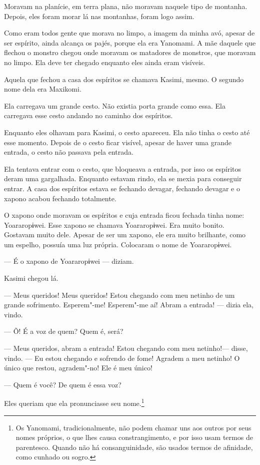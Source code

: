 Moravam na planície, em terra plana, não moravam naquele tipo de
montanha. Depois, eles foram morar lá nas montanhas, foram logo assim. 

Como eram todos gente que morava no limpo, a imagem da minha avó, apesar
de ser espírito, ainda alcança os pajés, porque ela era Yanomami. A mãe
daquele que flechou o monstro chegou onde moravam os matadores de
monstros, que moravam no limpo. Ela deve ter chegado enquanto eles ainda
eram visíveis. 

Aquela que fechou a casa dos espíritos se chamava Kasimi, mesmo. O segundo nome dela era Maxikomi. 

Ela carregava um grande cesto. Não existia porta grande como essa. Ela
carregava esse cesto andando no caminho dos espíritos. 

Enquanto eles olhavam para Kasimi, o cesto apareceu. Ela não tinha
o cesto até esse momento. Depois de o cesto ficar visível, apesar de
haver uma grande entrada, o cesto não passava pela entrada. 

Ela tentava entrar com o cesto, que bloqueava a entrada, por isso os
espíritos deram uma gargalhada. Enquanto estavam rindo, ela se mexia
para conseguir entrar. A casa dos espíritos estava se fechando devagar,
fechando devagar e o xapono acabou fechando totalmente. 

O xapono onde moravam os espíritos e cuja entrada ficou fechada tinha
nome: Yoararopɨwei. Esse xapono se chamava Yoararopɨwei. Era muito
bonito. Gostavam muito dele. Apesar de ser um xapono, ele era muito
brilhante, como um espelho, possuía uma luz própria. Colocaram o nome de
Yoararopɨwei.

--- É o xapono de Yoararopɨwei --- diziam. 

Kasimi chegou lá. 

--- Meus queridos! Meus queridos! Estou chegando com meu netinho de um
grande sofrimento. Esperem"-me! Esperem"-me aí! Abram a entrada! --- dizia ela,
vindo.

--- Õ! É a voz de quem? Quem é, será?

--- Meus queridos, abram a entrada! Estou chegando com meu netinho!---
disse, vindo. --- Eu estou chegando e sofrendo de fome! Agradem a meu
netinho! O único que restou, agradem"-no! Ele é meu único!

--- Quem é você? De quem é essa voz? 

Eles queriam que ela pronunciasse seu nome.\footnote{  Os Yanomami, tradicionalmente, não podem chamar uns aos outros por seus nomes próprios, o que lhes causa constrangimento, e por isso usam termos de parentesco. Quando não há consanguinidade, são usados termos de afinidade, como cunhado ou sogro.} 

